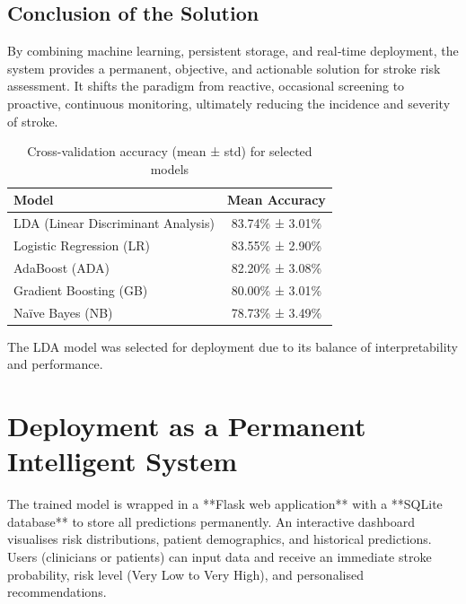 \documentclass[12pt,a4paper]{article}
\begin{document}
\subsection{Conclusion of the Solution}
By combining machine learning, persistent storage, and real‑time deployment, the system provides a permanent, objective, and actionable solution for stroke risk assessment. It shifts the paradigm from reactive, occasional screening to proactive, continuous monitoring, ultimately reducing the incidence and severity of stroke.

\begin{table}[H]
\centering
\caption{Cross-validation accuracy (mean ± std) for selected models}
\label{tab:cv_scores}
\begin{tabular}{|l|c|}
\hline
Model & Mean Accuracy \\
\hline
LDA (Linear Discriminant Analysis) & 83.74\% ± 3.01\% \\
\hline
Logistic Regression (LR) & 83.55\% ± 2.90\% \\
\hline
AdaBoost (ADA) & 82.20\% ± 3.08\% \\
\hline
Gradient Boosting (GB) & 80.00\% ± 3.01\% \\
\hline
Naïve Bayes (NB) & 78.73\% ± 3.49\% \\
\hline
\end{tabular}
\end{table}

The LDA model was selected for deployment due to its balance of interpretability and performance.

\section{Deployment as a Permanent Intelligent System}
The trained model is wrapped in a **Flask web application** with a **SQLite database** to store all predictions permanently. An interactive dashboard visualises risk distributions, patient demographics, and historical predictions. Users (clinicians or patients) can input data and receive an immediate stroke probability, risk level (Very Low to Very High), and personalised recommendations. 
\end{document}
